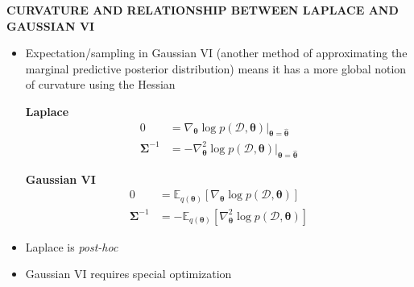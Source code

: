 \begin{whitebox}{\textbf{CURVATURE AND RELATIONSHIP BETWEEN LAPLACE AND GAUSSIAN VI}}
    \begin{itemize}
        \item Expectation/sampling in Gaussian VI (another method of approximating the marginal predictive posterior distribution) means it has a more global notion of curvature using the Hessian
        \begin{center}
            \begin{minipage}[c]{0.4\linewidth}
                \centering
                \small
                \textbf{Laplace}
                \begin{align*}
                    0&=\nabla_{\bm{\theta}}\log p(\mathcal{D},\bm{\theta})\bigr\rvert_{\bm{\theta}=\hat{\bm{\theta}}}\\
                    \bm{\Sigma}^{-1}&=-\nabla_{\bm{\theta}}^2\log p(\mathcal{D},\bm{\theta})\bigr\rvert_{\bm{\theta}=\hat{\bm{\theta}}}
                \end{align*}
            \end{minipage}%
            \hspace{5mm}
            \begin{minipage}[c]{0.4\linewidth}
                \centering
                \small
                \textbf{Gaussian VI}
                \begin{align*}
                    0&=\mathbb{E}_{q(\bm{\theta})}[\nabla_{\bm{\theta}}\log p(\mathcal{D},\bm{\theta})]\\
                    \bm{\Sigma}^{-1}&=-\mathbb{E}_{q(\bm{\theta})}[\nabla_{\bm{\theta}}^2\log p(\mathcal{D},\bm{\theta})]
                \end{align*}
            \end{minipage}
        \end{center}
        \item Laplace is \textit{post-hoc}
        \item Gaussian VI requires special optimization
    \end{itemize}
\end{whitebox}

